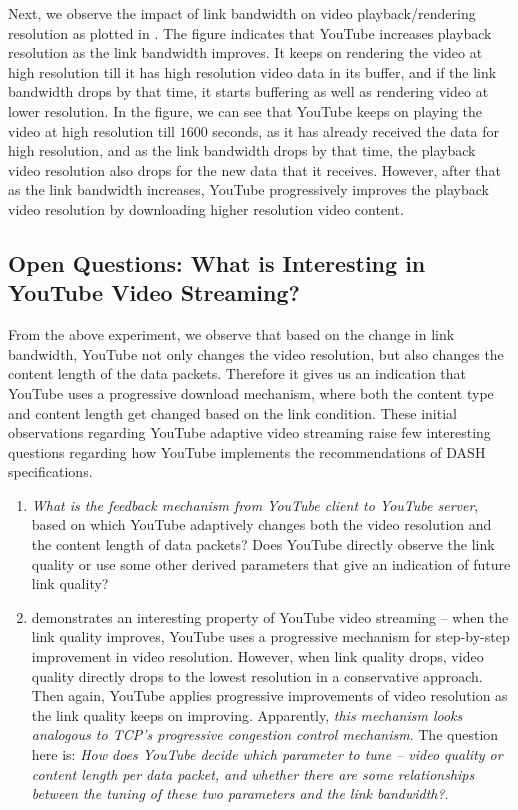 Next, we observe the impact of link bandwidth on video playback/rendering resolution as plotted in \fig{\ref{fig:reso}}. The figure indicates that YouTube increases playback resolution as the link bandwidth improves. It keeps on rendering the video at high resolution till it has high resolution video data in its buffer, and if the link bandwidth drops by that time, it starts buffering as well as rendering video at lower resolution. In the figure, we can see that YouTube keeps on playing the video at high resolution till $1600$ seconds, as it has already received the data for high resolution, and as the link bandwidth drops by that time, the playback video resolution also drops for the new data that it receives. However, after that as the link bandwidth increases, YouTube progressively improves the playback video resolution by downloading higher resolution video content.

\subsection{Open Questions: What is Interesting in YouTube Video Streaming?}

From the above experiment, we observe that based on the change in link bandwidth, YouTube not only changes the video resolution, but also changes the content length of the data packets. Therefore it gives us an indication that YouTube uses a progressive download mechanism, where both the content type and content length get changed based on the link condition. These initial observations regarding YouTube adaptive video streaming raise few interesting questions regarding how YouTube implements the recommendations of \ac{DASH} specifications. 
\begin{enumerate}
	\item {\em What is the feedback mechanism from YouTube client to YouTube server}, based on which YouTube adaptively changes both the video resolution and the content length of data packets?  Does YouTube directly observe the link quality or use some other derived parameters that give an indication of future link quality? 
	\item \fig{\ref{fig:reso}} demonstrates an interesting property of YouTube video streaming -- when the link quality improves, YouTube uses a progressive mechanism for step-by-step improvement in video resolution. However, when link quality drops, video quality directly drops to the lowest resolution in a conservative approach. Then again, YouTube applies progressive improvements of video resolution as the link quality keeps on improving. Apparently, {\em this mechanism looks analogous to \ac{TCP}'s progressive congestion control mechanism}. The question here is: {\em How does YouTube decide which parameter to tune -- video quality or content length per data packet, and whether there are some relationships between the tuning of these two parameters and the link bandwidth?}.  
\end{enumerate}


